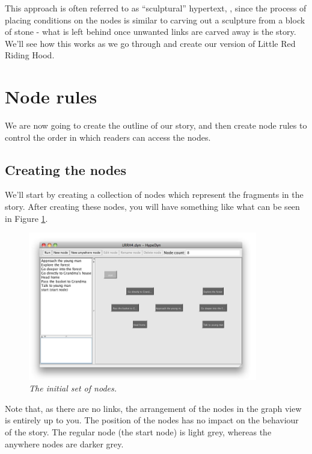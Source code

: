 \documentclass{article}
\begin{document}
This approach is often referred to as ``sculptural'' hypertext,
\cite{Bernstein:2001aa,Bernstein:2002aa}, since the process of placing conditions
on the nodes is similar to carving out a sculpture from a block of stone - what
is left behind once unwanted links are carved away is the story. We'll see how
this works as we go through and create our version of Little Red Riding Hood.

\section{Node rules}

We are now going to create the outline of our story, and then create node rules
to control the order in which readers can access the nodes.

\subsection{Creating the nodes}

We'll start by creating a collection of nodes which represent the fragments in
the story. After creating these nodes, you will have something like what can be
seen in Figure \ref{fig:tut3:initial_nodes}.

\begin{figure}[h]
  \centering \includegraphics[width=10cm]{images/hypedyn-tutorial-3-figure-2}
  \caption{\textit{The initial set of nodes.}}
  \label{fig:tut3:initial_nodes}
\end{figure} 

Note that, as there are no links, the arrangement of the nodes in the graph view
is entirely up to you. The position of the nodes has no impact on the behaviour
of the story. The regular node (the start node) is light grey, whereas the
anywhere nodes are darker grey.
\end{document}

